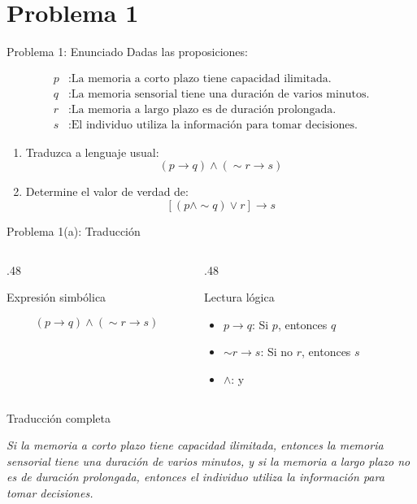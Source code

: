 \documentclass[aspectratio=169,11pt]{beamer}
\newcommand{\BloqueVisual}[2]{
	\begin{block}{#1}
		#2
	\end{block}
}
\begin{document}
	\section{Problema 1}
	
	\begin{frame}{Problema 1: Enunciado}
		Dadas las proposiciones:
		
		\begin{align*}
			p &: \text{La memoria a corto plazo tiene capacidad ilimitada.} \\
			q &: \text{La memoria sensorial tiene una duración de varios minutos.} \\
			r &: \text{La memoria a largo plazo es de duración prolongada.} \\
			s &: \text{El individuo utiliza la información para tomar decisiones.}
		\end{align*}
		
		\begin{enumerate}
			\item[a)] Traduzca a lenguaje usual:
			\[
			(p \to q)\land(\sim r \to s)
			\]
			\item[b)] Determine el valor de verdad de:
			\[
			[(p\land \sim q)\lor r]\to s
			\]
		\end{enumerate}
	\end{frame}
	
	\begin{frame}{Problema 1(a): Traducción}
		\begin{columns}[T]
			\begin{column}{.48\textwidth}
				\BloqueVisual{Expresión simbólica}{
					\[
					(p \to q)\land(\sim r \to s)
					\]
				}
			\end{column}
			\begin{column}{.48\textwidth}
				\BloqueVisual{Lectura lógica}{
					\begin{itemize}
						\item \(p\to q\): Si \(p\), entonces \(q\)
						\item \(\sim r\to s\): Si no \(r\), entonces \(s\)
						\item \(\land\): y
					\end{itemize}
				}
			\end{column}
		\end{columns}
		
		\vspace{0.2cm}
		
		\BloqueVisual{Traducción completa}{
			\emph{Si la memoria a corto plazo tiene capacidad ilimitada, entonces la memoria sensorial tiene una duración de varios minutos, y si la memoria a largo plazo no es de duración prolongada, entonces el individuo utiliza la información para tomar decisiones.}
		}
	\end{frame}
	
\end{document}
